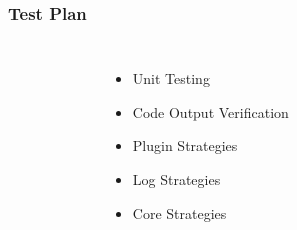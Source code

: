 \begin{frame}[fragile]
\frametitle{Test Plan}
\begin{columns}
\begin{figure}[b]
{
\scalebox{0.35}{}
}
\end{figure}
\vspace{3em}
\begin{itemize} %
    \item Unit Testing
    \item Code Output Verification
    \item Plugin Strategies
    \item Log Strategies
    \item Core Strategies
\end{itemize}
\end{columns}
\end{frame}


